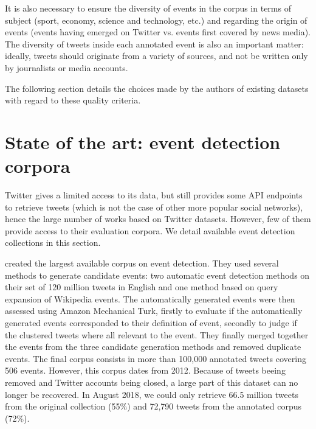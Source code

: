 It is also necessary to ensure the diversity of events in the corpus in terms of subject (sport, economy, science and technology, etc.) and regarding the origin of events (events having emerged on Twitter vs. events first covered by news media). The diversity of tweets inside each annotated event is also an important matter: ideally, tweets should originate from a variety of sources, and not be written only by journalists or media accounts.

The following section details the choices made by the authors of existing datasets with regard to these quality criteria.
        
		


\section{State of the art: event detection corpora}
\label{state of the art}
Twitter gives a limited access to its data, but still provides some API endpoints to retrieve tweets (which is not the case of other more popular social networks), hence the large number of works based on Twitter datasets. However, few of them provide access to their evaluation corpora. We detail available event detection collections in this section.

\citet{mcminn_building_2013} created the largest available corpus on event detection. They used several methods to generate candidate events: two automatic event detection methods on their set of 120 million tweets in English and one method based on query expansion of Wikipedia events. The automatically generated events were then assessed using Amazon Mechanical Turk, firstly to evaluate if the automatically generated events corresponded to their definition of event, secondly to judge if the clustered tweets where all relevant to the event. They finally merged together the events from the three candidate generation methods and removed duplicate events. The final corpus consists in more than 100,000 annotated tweets covering 506 events. However, this corpus dates from 2012. Because of tweets beeing removed and Twitter accounts being closed, a large part of this dataset can no longer be recovered. In August 2018, we could only retrieve 66.5 million tweets from the original collection (55\%) and 72,790 tweets from  the annotated corpus (72\%).

